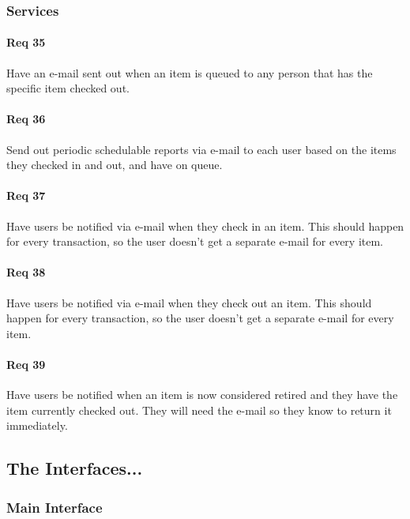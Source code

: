\documentclass[10pt, onecolumn, twoside, peerreview]{IEEEtran}
\begin{document}
\subsubsection{Services}
\paragraph*{Req 35} Have an e-mail sent out when an item is queued to any person that has the specific item checked out.\\

\paragraph*{Req 36} Send out periodic schedulable reports via e-mail to each user based on the items they checked in and out, and have on
queue.\\

\paragraph*{Req 37} Have users be notified via e-mail when they check in an item. This should happen for every transaction, so the user
doesn’t get a separate e-mail for every item.\\

\paragraph*{Req 38} Have users be notified via e-mail when they check out an item. This should happen for every transaction, so the user
doesn’t get a separate e-mail for every item.\\

\paragraph*{Req 39} Have users be notified when an item is now considered retired and they have the item currently checked out. They will
need the e-mail so they know to return it immediately.\\

\subsection{The Interfaces...}
\subsubsection{Main Interface}
\end{document}
